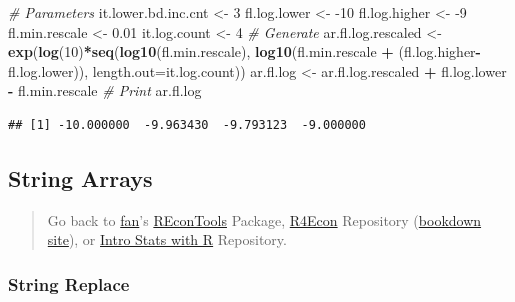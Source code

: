 \documentclass[
]{book}
\newenvironment{Shaded}{\begin{snugshade}}{\end{snugshade}}
\newcommand{\CommentTok}[1]{\textcolor[rgb]{0.56,0.35,0.01}{\textit{#1}}}
\newcommand{\DataTypeTok}[1]{\textcolor[rgb]{0.13,0.29,0.53}{#1}}
\newcommand{\DecValTok}[1]{\textcolor[rgb]{0.00,0.00,0.81}{#1}}
\newcommand{\FloatTok}[1]{\textcolor[rgb]{0.00,0.00,0.81}{#1}}
\newcommand{\KeywordTok}[1]{\textcolor[rgb]{0.13,0.29,0.53}{\textbf{#1}}}
\newcommand{\NormalTok}[1]{#1}
\newcommand{\OperatorTok}[1]{\textcolor[rgb]{0.81,0.36,0.00}{\textbf{#1}}}
\newcommand{\StringTok}[1]{\textcolor[rgb]{0.31,0.60,0.02}{#1}}
\begin{document}
\begin{Shaded}
\begin{Highlighting}[]
\CommentTok{# Parameters}
\NormalTok{it.lower.bd.inc.cnt <-}\StringTok{ }\DecValTok{3}
\NormalTok{fl.log.lower <-}\StringTok{ }\DecValTok{-10}
\NormalTok{fl.log.higher <-}\StringTok{ }\DecValTok{-9}
\NormalTok{fl.min.rescale <-}\StringTok{ }\FloatTok{0.01}
\NormalTok{it.log.count <-}\StringTok{ }\DecValTok{4}
\CommentTok{# Generate}
\NormalTok{ar.fl.log.rescaled <-}\StringTok{ }\KeywordTok{exp}\NormalTok{(}\KeywordTok{log}\NormalTok{(}\DecValTok{10}\NormalTok{)}\OperatorTok{*}\KeywordTok{seq}\NormalTok{(}\KeywordTok{log10}\NormalTok{(fl.min.rescale),}
                                      \KeywordTok{log10}\NormalTok{(fl.min.rescale }\OperatorTok{+}
\StringTok{                                              }\NormalTok{(fl.log.higher}\OperatorTok{-}\NormalTok{fl.log.lower)),}
                                      \DataTypeTok{length.out=}\NormalTok{it.log.count))}
\NormalTok{ar.fl.log <-}\StringTok{ }\NormalTok{ar.fl.log.rescaled }\OperatorTok{+}\StringTok{ }\NormalTok{fl.log.lower }\OperatorTok{-}\StringTok{ }\NormalTok{fl.min.rescale}
\CommentTok{# Print}
\NormalTok{ar.fl.log}
\end{Highlighting}
\end{Shaded}

\begin{verbatim}
## [1] -10.000000  -9.963430  -9.793123  -9.000000
\end{verbatim}

\hypertarget{string-arrays}{%
\subsection{String Arrays}\label{string-arrays}}

\begin{quote}
Go back to \href{http://fanwangecon.github.io/}{fan}'s \href{https://fanwangecon.github.io/REconTools/}{REconTools} Package, \href{https://fanwangecon.github.io/R4Econ/}{R4Econ} Repository (\href{https://fanwangecon.github.io/R4Econ/bookdown}{bookdown site}), or \href{https://fanwangecon.github.io/Stat4Econ/}{Intro Stats with R} Repository.
\end{quote}

\hypertarget{string-replace}{%
\subsubsection{String Replace}\label{string-replace}}
\end{document}
